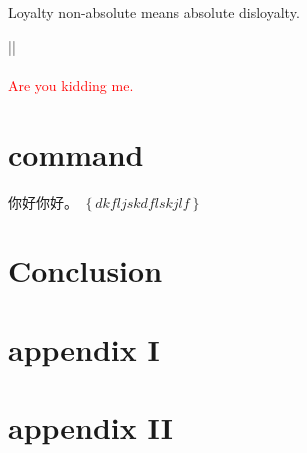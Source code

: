 \documentclass[11pt,oneside,a4paper]{article}
\newcommand{\ac}[1]{\left\{ #1 \right\}}
\begin{document}
\begin{nikname}
	\colorbox[gray]{0.95}{Loyalty non-absolute means absolute disloyalty.}
\end{nikname}
||\\
\setlength{\fboxrule}{13pt}
\setlength{\fboxsep}{1em}
\\
\textcolor{red}{Are you kidding me.}
\section{command}
你好你好。
$\ac{dkfljskdflskjlf}$
\section{Conclusion}
\begin{center} 
\end{center}
\appendix
\section{appendix I}
\section{appendix II}
\end{document}
